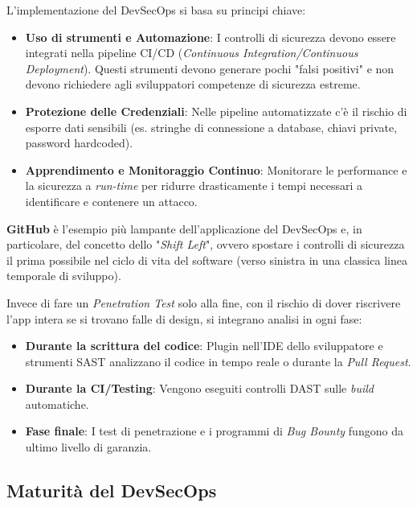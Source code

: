 L'implementazione del DevSecOps si basa su principi chiave:

\begin{itemize}
    \item \textbf{Uso di strumenti e Automazione}: I controlli di sicurezza devono 
    essere integrati nella pipeline CI/CD (\textit{Continuous Integration/Continuous 
    Deployment}). Questi strumenti devono generare pochi "falsi positivi" e non 
    devono richiedere agli sviluppatori competenze di sicurezza estreme.
    \item \textbf{Protezione delle Credenziali}: Nelle pipeline automatizzate c'è il 
    rischio di esporre dati sensibili (es. stringhe di connessione a database, chiavi 
    private, password hardcoded).
    \item \textbf{Apprendimento e Monitoraggio Continuo}: Monitorare le performance e 
    la sicurezza a \textit{run-time} per ridurre drasticamente i tempi necessari a 
    identificare e contenere un attacco.
\end{itemize}

\textbf{GitHub} è l'esempio più lampante dell'applicazione del DevSecOps e, in particolare, del 
concetto dello "\textit{Shift Left}", ovvero spostare i controlli di sicurezza il prima 
possibile nel ciclo di vita del software (verso sinistra in una classica linea 
temporale di sviluppo).

Invece di fare un \textit{Penetration Test} solo alla fine, con il rischio di dover 
riscrivere l'app intera se si trovano falle di design, si integrano analisi in ogni 
fase:

\begin{itemize}
    \item \textbf{Durante la scrittura del codice}: Plugin nell'IDE dello sviluppatore 
    e strumenti SAST analizzano il codice in tempo reale o durante la \textit{Pull Request}.
    \item \textbf{Durante la CI/Testing}: Vengono eseguiti controlli DAST sulle \textit{build}
    automatiche.
    \item \textbf{Fase finale}: I test di penetrazione e i programmi di \textit{Bug Bounty} 
    fungono da ultimo livello di garanzia.
\end{itemize}

\subsection{Maturità del DevSecOps}

